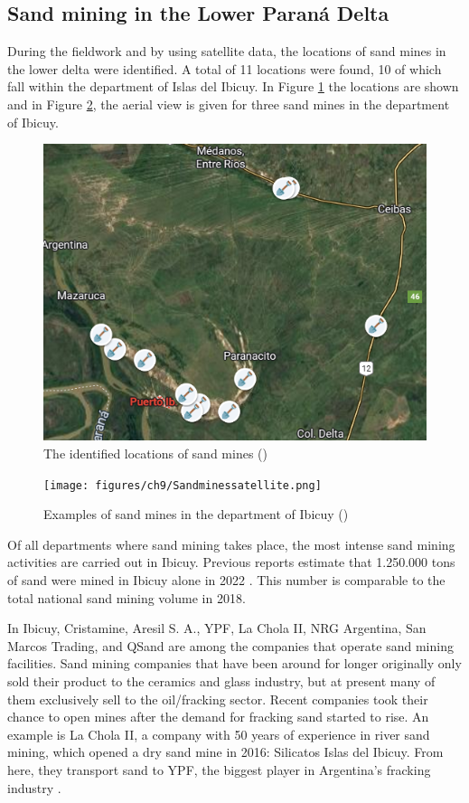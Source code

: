 \subsection{Sand mining in the Lower Paraná Delta}
During the fieldwork and by using satellite data, the locations of sand mines in the lower delta were identified. A total of 11 locations were found, 10 of which fall within the department of Islas del Ibicuy. In Figure \ref{fig:sandminemap} the locations are shown and in Figure \ref{fig:sandminessatellite}, the aerial view is given for three sand mines in the department of Ibicuy.

\begin{figure}[H]
    \centering
    \includegraphics[width=0.6\linewidth]{figures/ch9/SandMap.png}
    \caption{The identified locations of sand mines (\cite{googleearth2025})}
    \label{fig:sandminemap}
\end{figure}

\begin{figure}[H]
    \centering
    \texttt{[image: figures/ch9/Sandminessatellite.png]}
    \caption{Examples of sand mines in the department of Ibicuy (\cite{googleearth2025})}
    \label{fig:sandminessatellite}
\end{figure}

Of all departments where sand mining takes place, the most intense sand mining activities are carried out in Ibicuy. Previous reports estimate that 1.250.000 tons of sand were mined in Ibicuy alone in 2022 \autocite{fogliaSedArena2023}. This number is comparable to the total national sand mining volume in 2018.

In Ibicuy, Cristamine, Aresil S. A., YPF, La Chola II, NRG Argentina, San Marcos Trading, and QSand are among the companies that operate sand mining facilities. Sand mining companies that have been around for longer originally only sold their product to the ceramics and glass industry, but at present many of them exclusively sell to the oil/fracking sector. Recent companies took their chance to open mines after the demand for fracking sand started to rise. An example is La Chola II, a company with 50 years of experience in river sand mining, which opened a dry sand mine in 2016: Silicatos Islas del Ibicuy. From here, they transport sand to YPF, the biggest player in Argentina's fracking industry \autocite{fogliaSedArena2023}.

